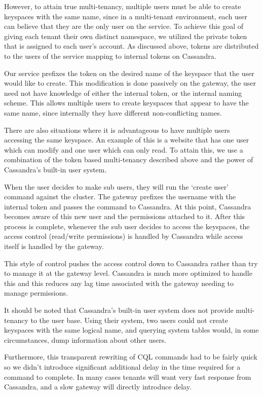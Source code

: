 \documentclass[11pt,notitlepage]{report}
\begin{document}
However, to attain true multi-tenancy, multiple users must be able to create keyspaces with the same name, since in a multi-tenant environment, each user can believe that they are the only user on the service. To achieve this goal of giving each tenant their own distinct namespace, we utilized the private token that is assigned to each user's account. As discussed above, tokens are distributed to the users of the service mapping to internal tokens on Cassandra. 

Our service prefixes the token on the desired name of the keyspace that the user would like to create. This modification is done passively on the gateway, the user need not have knowledge of either the internal token, or the internal naming scheme. This allows multiple users to create keyspaces that appear to have the same name, since internally they have different non-conflicting names. 

There are also situations where it is advantageous to have multiple users accessing the same keyspace. An example of this is a website that has one user which can modify and one user which can only read. To attain this, we use a combination of the token based multi-tenancy described above and the power of Cassandra's built-in user system. 

When the user decides to make sub users, they will run the `create user' command against the cluster. The gateway prefixes the username with the internal token and passes the command to Cassandra. At this point, Cassandra becomes aware of this new user and the permissions attached to it. After this process is complete, whenever the sub user decides to access the keyspaces, the access control (read/write permissions) is handled by Cassandra while access itself is handled by the gateway. 

This style of control pushes the access control down to Cassandra rather than try to manage it at the gateway level. Cassandra is much more optimized to handle this and this reduces any lag time associated with the gateway needing to manage permissions. 

It should be noted that Cassandra's built-in user system does not provide multi-tenancy to the user base. Using their system, two users could not create keyspaces with the same logical name, and querying system tables would, in some circumstances, dump information about other users. 

Furthermore, this transparent rewriting of CQL commands had to be fairly quick so we didn't introduce significant additional delay in the time required for a command to complete. In many cases tenants will want very fast response from Cassandra, and a slow gateway will directly introduce delay.
\end{document}
